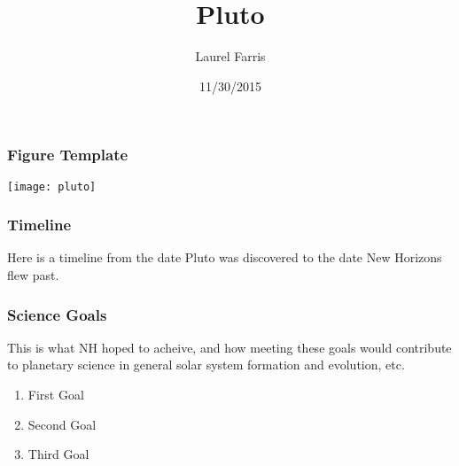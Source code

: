 \documentclass{beamer}
\title{Pluto}
\author{Laurel Farris}
\date{11/30/2015}
\begin{document}
\maketitle



\begin{frame}
	\frametitle{Figure Template}
    \texttt{[image: pluto]} 





\end{frame}



\begin{frame}
	\frametitle{Timeline}
	Here is a timeline from the date Pluto was discovered to the date
    New Horizons flew past.
\end{frame}

\begin{frame}
	\frametitle{Science Goals}
	This is what NH hoped to acheive, and how meeting these goals
    would contribute to planetary science in general solar system
    formation and evolution, etc.
    \begin{enumerate}
    \item First Goal
    \item Second Goal
    \item Third Goal
    \end{enumerate}
\end{frame}
\end{document}
